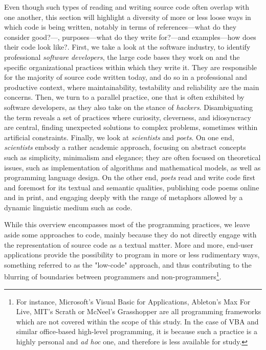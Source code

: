 Even though such types of reading and writing source code often overlap with one another, this section will highlight a diversity of more or less loose ways in which code is being written, notably in terms of references—what do they consider good?—, purposes—what do they write for?—and examples—how does their code look like?. First, we take a look at the software industry, to identify professional \emph{software developers}, the large code bases they work on and the specific organizational practices within which they write it. They are responsible for the majority of source code written today, and do so in a professional and productive context, where maintainability, testability and reliability are the main concerns. Then, we turn to a parallel practice, one that is often exhibited by software developers, as they also take on the stance of \emph{hackers}. Disambiguating the term reveals a set of practices where curiosity, cleverness, and idiosyncracy are central, finding unexpected solutions to complex problems, sometimes within artificial constraints. Finally, we look at \emph{scientists} and \emph{poets}. On one end, \emph{scientists} embody a rather academic approach,  focusing on abstract concepts such as simplicity, minimalism and elegance; they are often focused on theoretical issues, such as implementation of algorithms and mathematical models, as well as programming language design. On the other end, \emph{poets} read and write code first and foremost for its textual and semantic qualities, publishing code poems online and in print, and engaging deeply with the range of metaphors allowed by a dynamic linguistic medium such as code.

While this overview encompasses most of the programming practices, we leave aside some approaches to code, mainly because they do not directly engage with the representation of source code as a textual matter. More and more, end-user applications provide the possibility to program in more or less rudimentary ways, something referred to as the "low-code" approach\cite{oreilly_editorial_team_low-code_2021}, and thus contributing to the blurring of boundaries between programmers and non-programmers\footnote{For instance, Microsoft's Visual Basic for Applications, Ableton's Max For Live, MIT's Scrath or McNeel's Grasshopper are all programming frameworks which are not covered within the scope of this study. In the case of VBA and similar office-based high-level programming, it is because such a practice is a highly personal and \emph{ad hoc} one, and therefore is less available for study.}.

